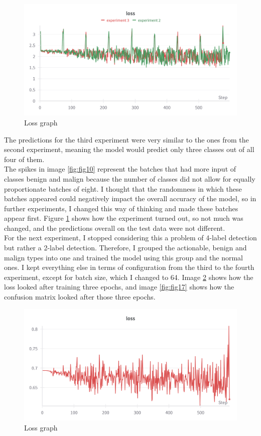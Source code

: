 \begin{figure}[!ht]
    \centering
    \includegraphics[width=1\textwidth]{figures/Figure14.png}
    \caption{Loss graph}
    \label{fig:fig13}
\end{figure}
The predictions for the third experiment were very similar to the ones from the second experiment, meaning the model would predict only three classes out of all four of them.\\
The spikes in image \ref{fig:fig10} represent the batches that had more input of classes benign and malign because the number of classes did not allow for equally proportionate batches of eight. I thought that the randomness in which these batches appeared could negatively impact the overall accuracy of the model, so in further experiments, I changed this way of thinking and made these batches appear first. Figure \ref{fig:fig13} shows how the experiment turned out, so not much was changed, and the predictions overall on the test data were not different.\\
For the next experiment, I stopped considering this a problem of 4-label detection but rather a 2-label detection. Therefore, I grouped the actionable, benign and malign types into one and trained the model using this group and the normal ones. I kept everything else in terms of configuration from the third to the fourth experiment, except for batch size, which I changed to 64. Image \ref{fig:fig16} shows how the loss looked after training three epochs, and image \ref{fig:fig17} shows how the confusion matrix looked after those three epochs.\\
\begin{figure}[!ht]
    \centering
    \includegraphics[width=1\linewidth]{figures/Figure17.png}
    \caption{Loss graph}
    \label{fig:fig16}
\end{figure}
